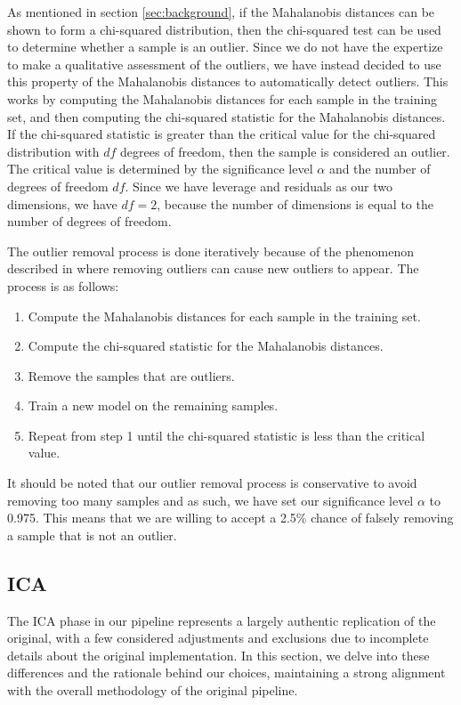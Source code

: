 As mentioned in section \ref{sec:background}, if the Mahalanobis distances can be shown to form a chi-squared distribution, then the chi-squared test can be used to determine whether a sample is an outlier.
Since we do not have the expertize to make a qualitative assessment of the outliers, we have instead decided to use this property of the Mahalanobis distances to automatically detect outliers.
This works by computing the Mahalanobis distances for each sample in the training set, and then computing the chi-squared statistic for the Mahalanobis distances.
If the chi-squared statistic is greater than the critical value for the chi-squared distribution with $df$ degrees of freedom, then the sample is considered an outlier.
The critical value is determined by the significance level $\alpha$ and the number of degrees of freedom $df$.
Since we have leverage and residuals as our two dimensions, we have $df = 2$, because the number of dimensions is equal to the number of degrees of freedom\cite{aggarwal_outlier_2017}.

The outlier removal process is done iteratively because of the phenomenon described in \citeauthor{cleggRecalibrationMarsScience2017} where removing outliers can cause new outliers to appear.
The process is as follows:
\begin{enumerate}
	\item Compute the Mahalanobis distances for each sample in the training set.
	\item Compute the chi-squared statistic for the Mahalanobis distances.
	\item Remove the samples that are outliers.
	\item Train a new model on the remaining samples.
	\item Repeat from step 1 until the chi-squared statistic is less than the critical value.
\end{enumerate}

It should be noted that our outlier removal process is conservative to avoid removing too many samples and as such, we have set our significance level $\alpha$ to 0.975.
This means that we are willing to accept a 2.5\% chance of falsely removing a sample that is not an outlier.

\subsection{ICA}
The ICA phase in our pipeline represents a largely authentic replication of the original, with a few considered adjustments and exclusions due to incomplete details about the original implementation.
In this section, we delve into these differences and the rationale behind our choices, maintaining a strong alignment with the overall methodology of the original pipeline.

